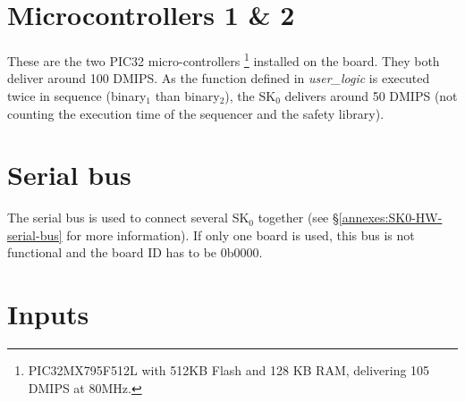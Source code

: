 \section{Microcontrollers 1 \& 2}

These are the two PIC32 micro-controllers \footnote{PIC32MX795F512L with 512KB Flash and 128 KB RAM, delivering 105 DMIPS at 80MHz.} installed on the board. They both deliver around 100 DMIPS. As the function defined in \textit{user\_logic} is executed twice in sequence (binary$_1$ than binary$_2$), the SK$_0$ delivers around 50 DMIPS (not counting the execution time of the sequencer and the safety library).

\section{Serial bus}

The serial bus is used to connect several SK$_0$ together (see \S\ref{annexes:SK0-HW-serial-bus} for more information). If only one board is used, this bus is not functional and the board ID has to be 0b0000.

\section{Inputs}

